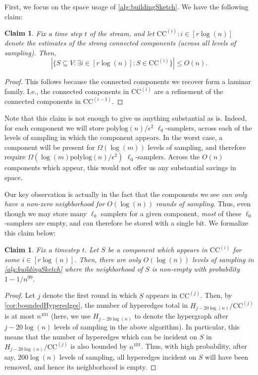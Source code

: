 \documentclass[11pt]{article}
\newtheorem{claim}[theorem]{Claim}
\theoremstyle{definition}
\newcommand{\eps}{\epsilon}
\newcommand{\polylog}{\mathrm{polylog}}
\begin{document}
First, we focus on the space usage of \cref{alg:buildingSketch}. We have the following claim:

\begin{claim}
	Fix a time step $t$ of the stream, and let $\mathrm{CC}^{(i)}: i \in [r \log(n)]$ denote the estimates of the strong connected components (across all levels of sampling). Then,
	\[
	|\{S \subseteq V: \exists i \in [r \log(n)]: S \in \mathrm{CC}^{(i)} \}| \leq O(n).
	\]
\end{claim}

\begin{proof}
	This follows because the connected components we recover form a laminar family. I.e., the connected components in $\mathrm{CC}^{(i)}$ are a refinement of the connected components in $\mathrm{CC}^{(i-1)}$.
\end{proof}

Note that this claim is not enough to give us anything substantial as is. Indeed, for each component we will store $\mathrm{polylog}(n) / \eps^2$ $\ell_0$-samplers, across each of the levels of sampling in which the component appears. In the worst case, a component will be present for $\Omega(\log(m))$ levels of sampling, and therefore require $\Omega(\log(m) \polylog(n) / \eps^2)$ $\ell_0$-samplers. Across the $O(n)$ components which appear, this would not offer us any substantial savings in space. 

Our key observation is actually in the fact that the components we see \emph{can only have a non-zero neighborhood for $O(\log(n))$ rounds of sampling}. Thus, even though we may store many $\ell_0$ samplers for a given component, \emph{most} of these $\ell_0$-samplers are empty, and can therefore be stored with a single bit. We formalize this claim below:

\begin{claim}\label{clm:numberLevelsInsertion}
	Fix a timestep $t$. Let $S$ be a component which appears in $\mathrm{CC}^{(i)}$ for some $i \in [r \log(n)]$. Then, there are only $O(\log(n))$ levels of sampling in \cref{alg:buildingSketch} where the neighborhood of $S$ is non-empty with probability $1 - 1 / n^{99}$.
\end{claim}

\begin{proof}
	Let $j$ denote the first round in which $S$ appears in $\mathrm{CC}^{(j)}$. Then, by \cref{cor:boundedHyperedges}, the number of hyperedges total in $H_{j - 20 \log(n)} / \mathrm{CC}^{(j)}$ is at most $n^{101}$ (here, we use $H_{j - 20\log(n)}$ to denote the hypergraph after $j - 20\log(n)$ levels of sampling in the above algorithm). In particular, this means that the number of hyperedges which can be incident on $S$ in $H_{j - 20 \log(n)} / \mathrm{CC}^{(j)}$ is also bounded by $n^{101}$. Thus, with high probability, after say, $200 \log(n)$ levels of sampling, all hyperedges incident on $S$ will have been removed, and hence its neighborhood is empty.
\end{proof}
\end{document}
